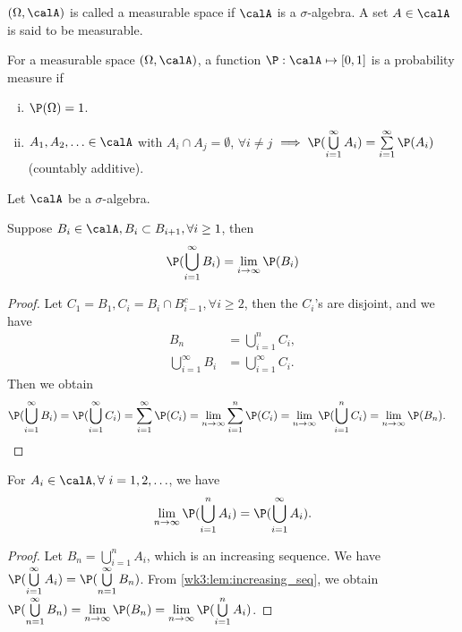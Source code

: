 \documentclass[../aipt.tex]{subfiles}
\begin{document}
$\left(\Omega, \calA\right)$ is called a measurable space if $\calA$ is a $\sigma$-algebra. A set $A \in \calA$ is said to be measurable.

\begin{Definition}
For a measurable space $(\Omega,\calA)$, a function $\P: \calA \mapsto \left[0, 1\right]$ is a probability measure if
\begin{enumerate}[(i)]
\item $\P(\Omega) = 1$.
\item $A_1, A_2, \ldots \in \calA$ with $A_i \cap A_j = \emptyset$, $\forall i \neq j$ $\implies \P(\bigcup\limits_{i=1}^{\infty}A_i) = \sum\limits_{i=1}^{\infty}\P(A_i)$ (countably additive).
\end{enumerate}
\end{Definition}

Let $\calA$ be a $\sigma$-algebra.

\begin{Lemma} \label{wk3:lem:increasing_seq}
Suppose $B_i \in \calA, B_i \subset B_{i+1}, \forall i\geq 1$, then
\begin{align*}
\P(\bigcup\limits_{i=1}^{\infty} B_i) = \lim_{i \to \infty}\P(B_i)
\end{align*}
\end{Lemma}
\begin{proof}
Let $C_1 = B_1, C_i = B_i \cap B_{i-1}^c, \forall i \geq 2$, then the $C_i$'s are disjoint, and we have
\begin{align*}
B_n &= \bigcup\limits_{i=1}^{n} C_i, \\
\bigcup\limits_{i=1}^{\infty} B_i &= \bigcup\limits_{i=1}^{\infty} C_i.
\end{align*}
Then we obtain
\begin{align*}
& \P(\bigcup\limits_{i=1}^{\infty} B_i) 
= \P(\bigcup\limits_{i=1}^{\infty} C_i) 
= \sum\limits_{i=1}^{\infty} \P(C_i) 
= \lim_{n \to \infty} \sum\limits_{i=1}^{n} \P(C_i)
= \lim_{n \to \infty} \P(\bigcup\limits_{i=1}^{n} C_i) 
= \lim_{n \to \infty} \P(B_n).
\end{align*}
\end{proof}

\begin{Corollary}
For $A_i \in \calA, \forall\ i=1, 2, \ldots$, we have
\begin{align*}
\lim_{n \to \infty} \P(\bigcup\limits_{i=1}^{n} A_i) = \P(\bigcup\limits_{i=1}^{\infty} A_i).
\end{align*}
\end{Corollary}
\begin{proof}
Let $B_n = \bigcup\limits_{i=1}^n A_i$, which is an increasing sequence. We have $\P(\bigcup\limits_{i=1}^{\infty} A_i) = \P(\bigcup\limits_{n=1}^{\infty} B_n)$. From \cref{wk3:lem:increasing_seq}, we obtain $\P(\bigcup\limits_{n=1}^{\infty} B_n) = \lim\limits_{n \to \infty}\P(B_n) = \lim\limits_{n \to \infty} \P(\bigcup\limits_{i=1}^{n} A_i)$.
\end{proof}
\end{document}

